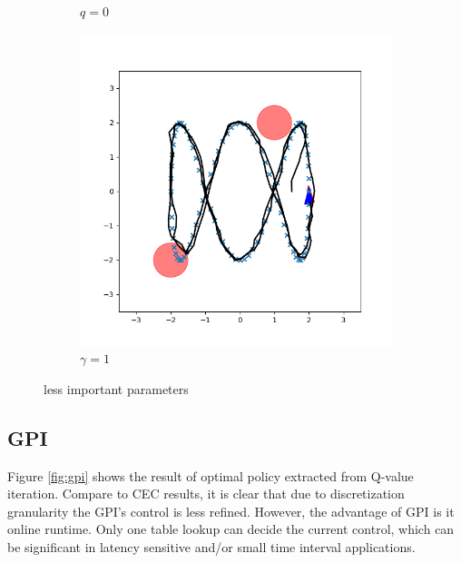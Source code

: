 \documentclass[conference]{IEEEtran}
\begin{document}
\begin{figure}[h]
\begin{subfigure}[b]{0.3\textwidth}
        \caption{$q=0$}
        \label{fig:q0}
    \end{subfigure}
    \hfill
    \begin{subfigure}[b]{0.3\textwidth}
        \includegraphics[width=\textwidth]{../fig/trajectory.cec.gamma_1.png}
        \caption{$\gamma=1$}
        \label{fig:gamma1}
    \end{subfigure}
    \caption{less important parameters}
    \label{fig:p}
\end{figure}

\subsection{GPI}
Figure \ref{fig:gpi} shows the result of optimal policy extracted from Q-value iteration.
Compare to CEC results, it is clear that due to discretization granularity 
the GPI's control is less refined. However, the advantage of GPI is it online runtime.
Only one table lookup can decide the current control, which can be significant in 
latency sensitive and/or small time interval applications.
\end{document}
